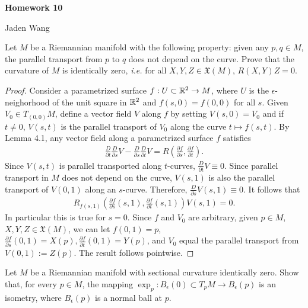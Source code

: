 \documentclass[12pt]{article}
\begin{document}
\centerline {\textsf{\textbf{\LARGE{Homework 10}}}}
\centerline {Jaden Wang}
\vspace{.15in}
\begin{problem}[Do Carmo 4.4]
Let $ M$ be a Riemannian manifold with the following property: given any  $ p,q \in M$, the parallel transport from $ p$ to  $ q$ does not depend on the curve. Prove that the curvature of  $ M$ is identically zero,  \emph{i.e.} for all $ X,Y,Z \in \mathfrak{X}(M)$, $ R(X,Y)Z = 0$.
\end{problem}
\begin{proof}
Consider a parametrized surface $ f: U \subset \mathbb{R}^2 \to M$, where $ U$ is the  $ \epsilon$-neighorhood of the unit square in $ \mathbb{R}^2$ and $ f(s,0) = f(0,0)$ for all $ s$. Given $ V_0 \in T_{(0,0)}M$, define a vector field  $ V$ along  $ f$ by setting  $ V(s,0) = V_0$ and if $ t \neq 0$,  $ V(s,t)$ is the parallel transport of  $ V_0$ along the curve $t \mapsto  f(s,t)$. By Lemma 4.1, any vector field along a parametrized surface $ f$ satisfies
 \begin{align*}
	\frac{D}{\partial t} \frac{D}{ \partial s} V - \frac{D}{\partial s} \frac{D}{\partial t} V = R \left( \frac{\partial f}{\partial s} , \frac{\partial f}{\partial t}  \right) .
\end{align*}
Since $ V(s,t)$ is parallel transported along  $ t$-curves,  $ \frac{D}{\partial t} V \equiv 0$. Since parallel transport in $ M$ does not depend on the curve, $ V(s,1)$ is also the parallel transport of  $ V(0,1)$ along an $ s$-curve.  Therefore, $ \frac{D}{\partial s} V(s,1) \equiv 0$. It follows that
\begin{align*}
	R_{f(s,1)}\left( \frac{\partial f}{\partial s} (s,1), \frac{\partial f}{\partial t} (s,1) \right) V(s,1) =0 .
\end{align*}
In particular this is true for $ s=0$. Since $ f$ and  $ V_0$ are arbitrary, given $ p \in M$, $ X,Y,Z \in \mathfrak{X}(M)$, we can let $ f(0,1) = p$, $ \frac{\partial f}{\partial s}(0,1) = X(p) , \frac{\partial f}{\partial t}(0,1) = Y(p) $, and $ V_0$ equal the parallel transport from $ V(0,1):= Z(p)$. The result follows pointwise.

\end{proof}
\begin{problem}[5.1]
Let $ M$ be a Riemannian manifold with sectional curvature identically zero. Show that, for every  $ p \in M$, the mapping $ \exp_p: B_{ \epsilon}(0) \subset T_pM \to B_{ \epsilon}(p)$ is an isometry, where $ B_{ \epsilon}(p)$ is a normal ball at $ p$.
\end{problem}
\end{document}
